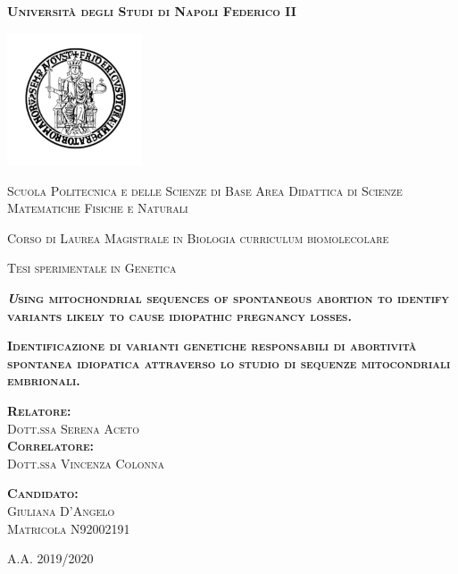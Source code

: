 \documentclass[
11pt, %
oneside, %
english, %
singlespacing, %
headsepline, %
]{MastersDoctoralThesisV2} %
\author{Giuliana D'Angelo}
\date{23 march 2021}
\begin{document}
\begin{titlepage}
\centering
{\scshape\large\normalfont\bfseries Università degli Studi di Napoli Federico II \par}
 \vspace{0.7cm} 
 \includegraphics[width=0.30\textwidth]{Fig/logo.png}
 \par
 \vspace{0.5cm}
\hspace{2cm}
{\scshape\large\normalfont Scuola Politecnica e delle Scienze di Base
\newline
Area Didattica di Scienze Matematiche Fisiche e Naturali
 \par}
 \vspace{0.5cm}
{\scshape\large\normalfont Corso di Laurea Magistrale in Biologia curriculum biomolecolare
 \par}
 \vspace{0.5cm} 
{\scshape\large\normalfont Tesi sperimentale in Genetica
 \par}
  \vspace{0.8cm}
{\scshape\large\normalfont\bfseries\textit Using mitochondrial sequences of spontaneous abortion to identify variants likely to cause idiopathic pregnancy losses.
 \par}
  \vspace{0.8cm}
{\scshape\large\normalfont\bfseries  Identificazione di varianti genetiche  responsabili di abortività spontanea idiopatica attraverso lo studio di sequenze mitocondriali embrionali.
 \par} 
\vspace{0.8cm} 
\begin{minipage}{0.45\textwidth}
{\scshape\normalfont\large\bfseries Relatore:}\\
{\scshape\normalfont\large Dott.ssa Serena Aceto} \\ 
{\scshape\normalfont\large\bfseries Correlatore:} \\
{\scshape\normalfont\large Dott.ssa Vincenza Colonna}\\
\end{minipage}
\hspace{2.5cm}
\begin{minipage}{0.25\textwidth}
{\scshape\normalfont\large\bfseries Candidato:}\\
 {\scshape\normalfont\large Giuliana D'Angelo \\
 Matricola N92002191} 
\end{minipage}
\vfill
\centering
\vspace{0.48cm} 
{\scshape\Large\normalfont A.A. 2019/2020}





\end{titlepage}
\end{document}

